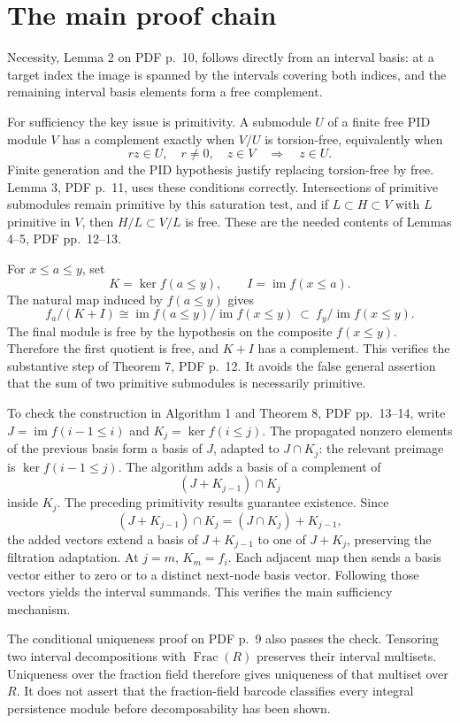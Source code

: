 \documentclass[10pt]{article}
\begin{document}
\section*{The main proof chain}
Necessity, Lemma 2 on PDF p. 10, follows directly from an interval basis: at a target index the image is spanned by the intervals covering both indices, and the remaining interval basis elements form a free complement.\par
For sufficiency the key issue is primitivity. A submodule \(U\) of a finite free PID module \(V\) has a complement exactly when \(V/U\) is torsion-free, equivalently when \[rz\in U,\quad r\ne0,\quad z\in V
 \quad\Longrightarrow\quad z\in U .\] Finite generation and the PID hypothesis justify replacing torsion-free by free. Lemma 3, PDF p. 11, uses these conditions correctly. Intersections of primitive submodules remain primitive by this saturation test, and if \(L\subset H\subset V\) with \(L\) primitive in \(V\), then \(H/L\subset V/L\) is free. These are the needed contents of Lemmas 4–5, PDF pp. 12–13.\par
For \(x\le a\le y\), set \[K=\ker f(a\le y),\qquad I=\operatorname{im}f(x\le a).\] The natural map induced by \(f(a\le y)\) gives \[f_a/(K+I)
 \cong \operatorname{im}f(a\le y)/\operatorname{im}f(x\le y)
 \ \subset\ f_y/\operatorname{im}f(x\le y).\] The final module is free by the hypothesis on the composite \(f(x\le y)\). Therefore the first quotient is free, and \(K+I\) has a complement. This verifies the substantive step of Theorem 7, PDF p. 12. It avoids the false general assertion that the sum of two primitive submodules is necessarily primitive.\par
To check the construction in Algorithm 1 and Theorem 8, PDF pp. 13–14, write \(J=\operatorname{im}f(i-1\le i)\) and \(K_j=\ker f(i\le j)\). The propagated nonzero elements of the previous basis form a basis of \(J\), adapted to \(J\cap K_j\): the relevant preimage is \(\ker f(i-1\le j)\). The algorithm adds a basis of a complement of \[(J+K_{j-1})\cap K_j\] inside \(K_j\). The preceding primitivity results guarantee existence. Since \[(J+K_{j-1})\cap K_j=(J\cap K_j)+K_{j-1},\] the added vectors extend a basis of \(J+K_{j-1}\) to one of \(J+K_j\), preserving the filtration adaptation. At \(j=m\), \(K_m=f_i\). Each adjacent map then sends a basis vector either to zero or to a distinct next-node basis vector. Following those vectors yields the interval summands. This verifies the main sufficiency mechanism.\par
The conditional uniqueness proof on PDF p. 9 also passes the check. Tensoring two interval decompositions with \(\operatorname{Frac}(R)\) preserves their interval multisets. Uniqueness over the fraction field therefore gives uniqueness of that multiset over \(R\). It does not assert that the fraction-field barcode classifies every integral persistence module before decomposability has been shown.\par
\end{document}
